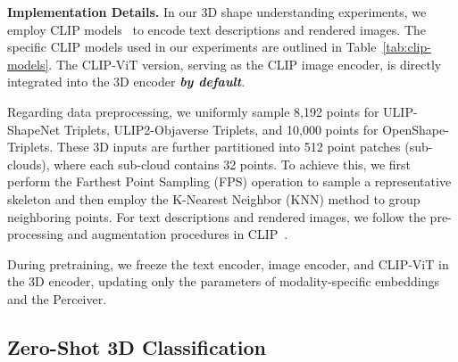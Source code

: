 \documentclass{article}
\newcommand{\clipvit}{CLIP-ViT\xspace}
\newcommand{\dsA}{\textcolor{myyellow}{}}
\newcommand{\dsB}{{\textcolor{mygreen}{}}}
\newcommand{\dsC}{{\textcolor{mypurpledeep}{}}}
\begin{document}
\textbf{Implementation Details.}
In our 3D shape understanding experiments, we employ CLIP models~\cite{openai_clip,cherti2022openclip} to encode text descriptions and rendered images. The specific CLIP models used in our experiments are outlined in Table~\ref{tab:clip-models}. The \clipvit version, serving as the CLIP image encoder, is directly integrated into the 3D encoder \textit{\textbf{by default}}.


Regarding data preprocessing, we uniformly sample 8,192 points for \dsA ULIP-ShapeNet Triplets, \dsB ULIP2-Objaverse Triplets, and 10,000 points for \dsC OpenShape-Triplets. These 3D inputs are further partitioned into 512 point patches (sub-clouds), where each sub-cloud contains 32 points. To achieve this, we first perform the Farthest Point Sampling (FPS) operation to sample a representative skeleton and then employ the K-Nearest Neighbor (KNN) method to group neighboring points.
For text descriptions and rendered images, we follow the pre-processing and augmentation procedures in CLIP~\cite{openai_clip,cherti2022openclip}. 

During pretraining, we freeze the text encoder, image encoder, and \clipvit in the 3D encoder, updating only the parameters of modality-specific embeddings and the Perceiver.


\subsection{Zero-Shot 3D Classification}
\end{document}
